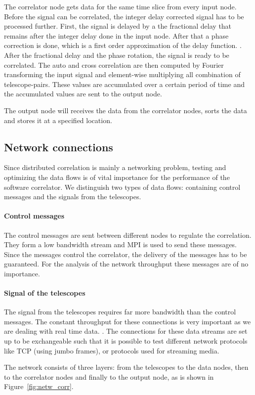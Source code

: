 The correlator node gets data for the same time slice from every input
node. Before the signal can be correlated, the integer delay corrected
signal has to be processed further. First, the signal is delayed by a the fractional
delay that remains after the integer delay done in the input node.
After that a phase correction is done, which is a first order
approximation of the delay function. .
After the fractional delay and the phase rotation, the signal is ready
to be correlated. The auto and cross correlation are then computed by
Fourier transforming the input signal and element-wise multiplying all
combination of telescope-pairs. These values are accumulated over a
certain period of time and the accumulated values are sent to the
output node.

The output node will receives the data from the correlator nodes,
sorts the data and stores it at a specified location.

\subsection{Network connections}
Since distributed correlation is mainly a networking problem, testing
and optimizing the data flows is of vital importance for the
performance of the software correlator. We distinguish two types of
data flows: containing control messages and the signals from the
telescopes.

\paragraph{Control messages}
The control messages are sent between different nodes to regulate the
correlation. They form a low bandwidth stream and MPI is used to send
these messages. Since the messages control the correlator, the
delivery of the messages has to be guaranteed. For the analysis of the
network throughput these messages are of no importance.

\paragraph{Signal of the telescopes}
The signal from the telescopes requires far more bandwidth than the
control messages. The constant throughput for these connections is
very important as we are dealing with real time data. . The connections for these data streams are set up to be
exchangeable such that it is possible to test different network
protocols like TCP (using jumbo frames), or protocols used for
streaming media.

The network consists of three layers: from the
telescopes to the data nodes, then to the correlator nodes and finally
to the output node, as is shown in
Figure~\ref{fig:netw_corr}.




